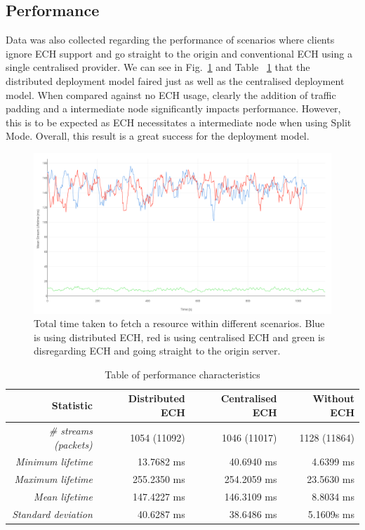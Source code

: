 \subsection{Performance}

Data was also collected regarding the performance of scenarios where clients ignore ECH support and go straight to the origin and conventional ECH using a single centralised provider. We can see in Fig.~\ref{performance_graph_figure} and Table ~\ref{performance_table} that the distributed deployment model faired just as well as the centralised deployment model. When compared against no ECH usage, clearly the addition of traffic padding and a intermediate node significantly impacts performance. However, this is to be expected as ECH necessitates a intermediate node when using Split Mode. Overall, this result is a great success for the deployment model.

\begin{figure}[ht]
\centerline{\includegraphics[width=120mm]{images/performance.png}}
\caption[Performance comparison graph]{Total time taken to fetch a resource within different scenarios. Blue is using distributed ECH, red is using centralised ECH and green is disregarding ECH and going straight to the origin server.}
\label{performance_graph_figure}
\end{figure}


\begin{table}[!h]
\begin{center}
\begin{tabular}{|r|r|r|r|}
\hline
\bf Statistic & \bf Distributed ECH & \bf Centralised ECH  & \bf Without ECH \\
\hline
\it \# streams (packets) & 1054 (11092) & 1046 (11017) & 1128 (11864) \\
\hline
\it Minimum lifetime & 13.7682 ms & 40.6940 ms & 4.6399 ms \\
\hline
\it Maximum lifetime & 255.2350 ms & 254.2059 ms & 23.5630 ms \\
\hline
\it Mean lifetime & 147.4227 ms & 146.3109 ms & 8.8034 ms \\
\hline
\it Standard deviation & 40.6287 ms & 38.6486 ms & 5.1609s ms \\
\hline
\end{tabular}
\end{center}
\caption[Table of performance characteristics]{Table of performance characteristics}
\label{performance_table}
\end{table}


